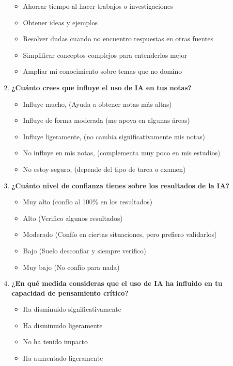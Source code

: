 \documentclass{article}
\newenvironment{recoleccionDeInformacion}{}{}
\begin{document}
\begin{recoleccionDeInformacion}
\begin{multicols}{2}
\begin{enumerate}
\begin{itemize}
          \item Ahorrar tiempo al hacer trabajos o investigaciones
          \item Obtener ideas y ejemplos
          \item Resolver dudas cuando no encuentro respuestas en otras fuentes
          \item Simplificar conceptos complejos para entenderlos mejor
          \item Ampliar mi conocimiento sobre temas que no domino
      \end{itemize}
      \item \textbf{¿Cuánto crees que influye el uso de IA en tus notas?}
      \begin{itemize}
          \item Influye mucho, (Ayuda a obtener notas más altas)
          \item Influye de forma moderada (me apoya en algunas áreas)
          \item Influye ligeramente, (no cambia significativamente mis notas)
          \item No influye en mis notas, (complementa muy poco en mis estudios)
          \item No estoy seguro, (depende del tipo de tarea o examen)
      \end{itemize}
      \item \textbf{¿Cuánto nivel de confianza tienes sobre los resultados de la IA?}
      \begin{itemize}
        \item Muy alto (confío al 100\% en los resultados)
        \item Alto (Verifico algunos resultados)
        \item Moderado (Confío en ciertas situaciones, pero prefiero validarlos)
        \item Bajo (Suelo desconfiar y siempre verifico)
        \item Muy bajo (No confío para nada)
      \end{itemize}
      \item \textbf{¿En  qué  medida  consideras  que  el  uso  de  IA  ha  influido  en  tu  capacidad  de pensamiento  crítico?}
      \begin{itemize}
        \item Ha disminuido significativamente
        \item Ha disminuido ligeramente
        \item No ha tenido impacto
        \item Ha aumentado ligeramente

\end{itemize}
\end{enumerate}
\end{multicols}
\end{recoleccionDeInformacion}
\end{document}
